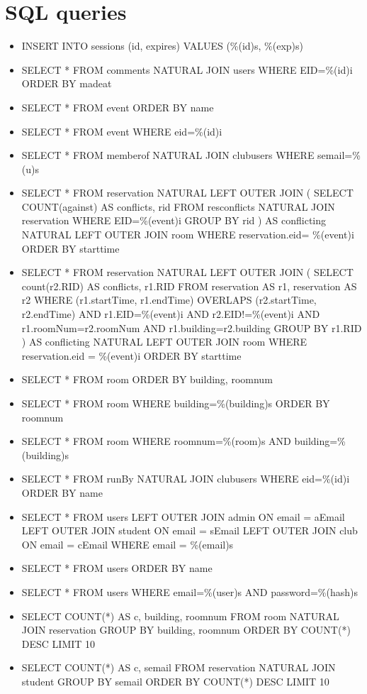 \documentclass{article}
\begin{document}
\section{SQL queries}
\begin{itemize}
\item INSERT INTO sessions (id, expires) VALUES (\%(id)s, \%(exp)s)
\item SELECT * FROM comments NATURAL JOIN users WHERE EID=\%(id)i ORDER BY madeat
\item SELECT * FROM event ORDER BY name
\item SELECT * FROM event WHERE eid=\%(id)i
\item SELECT * FROM memberof NATURAL JOIN clubusers WHERE semail=\%(u)s
\item SELECT * FROM reservation NATURAL LEFT OUTER JOIN ( SELECT COUNT(against)
AS conflicts, rid FROM resconflicts NATURAL JOIN reservation WHERE EID=\%(event)i GROUP BY rid ) AS conflicting NATURAL LEFT OUTER JOIN room WHERE reservation.eid= \%(event)i ORDER BY starttime
\item SELECT * FROM reservation NATURAL LEFT OUTER JOIN ( SELECT count(r2.RID)
AS conflicts, r1.RID FROM reservation AS r1, reservation AS r2 WHERE
(r1.startTime, r1.endTime) OVERLAPS (r2.startTime, r2.endTime) AND
r1.EID=\%(event)i AND r2.EID!=\%(event)i AND r1.roomNum=r2.roomNum AND
r1.building=r2.building GROUP BY r1.RID ) AS conflicting NATURAL LEFT OUTER JOIN
room WHERE reservation.eid = \%(event)i ORDER BY starttime
\item SELECT * FROM room ORDER BY building, roomnum
\item SELECT * FROM room WHERE building=\%(building)s ORDER BY roomnum
\item SELECT * FROM room WHERE roomnum=\%(room)s AND building=\%(building)s
\item SELECT * FROM runBy NATURAL JOIN clubusers WHERE eid=\%(id)i ORDER BY name
\item SELECT * FROM users LEFT OUTER JOIN admin ON email = aEmail LEFT OUTER
JOIN student ON email = sEmail LEFT OUTER JOIN club ON email = cEmail WHERE
email = \%(email)s
\item SELECT * FROM users ORDER BY name
\item SELECT * FROM users WHERE email=\%(user)s AND password=\%(hash)s
\item SELECT COUNT(*) AS c, building, roomnum FROM room NATURAL JOIN reservation GROUP BY building, roomnum ORDER BY COUNT(*) DESC LIMIT 10
\item SELECT COUNT(*) AS c, semail FROM reservation NATURAL JOIN student GROUP BY semail ORDER BY COUNT(*) DESC LIMIT 10

\end{itemize}
\end{document}
